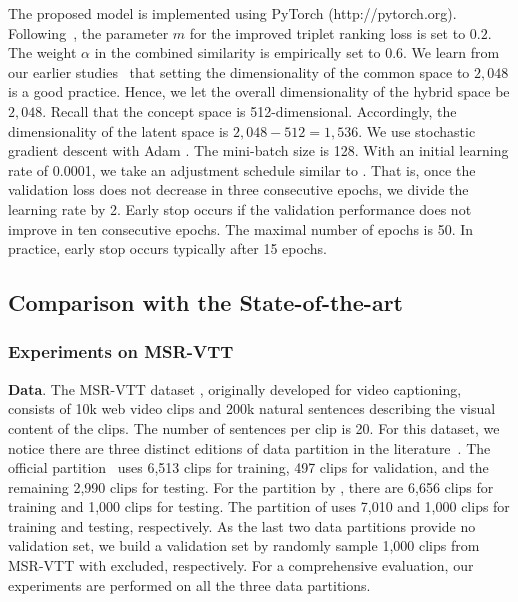 The proposed model is implemented using PyTorch (http://pytorch.org). Following~\cite{faghri2017vse}, the parameter $m$ for the improved triplet ranking loss is set to $0.2$. The weight $\alpha$ in the combined similarity is empirically set to $0.6$. 
We learn from our earlier studies~\cite{li2019w2vv++,cvpr2019-dual-dong} that setting the dimensionality of the common space to $2,048$ is a good practice. Hence, we let the overall dimensionality of the hybrid space be $2,048$. Recall that the concept space is 512-dimensional. Accordingly, the dimensionality of the latent space is $2,048-512=1,536$.
We use stochastic gradient descent with Adam \cite{kingma2014adam}. The mini-batch size is 128. With an initial learning rate of 0.0001, we take an adjustment schedule similar to \cite{dong2018predicting}. That is, once the validation loss does not decrease in three consecutive epochs, we divide the learning rate by 2. Early stop occurs if the validation performance does not improve in ten consecutive epochs. The maximal number of epochs is 50. In practice, early stop occurs typically after 15 epochs. 



\subsection{Comparison with the State-of-the-art} \label{ssec:exp-sota}


\subsubsection{Experiments on MSR-VTT}

\textbf{Data}. 
The MSR-VTT dataset \cite{xu2016msr}, originally developed for video captioning, consists of 10k web video clips and 200k natural sentences describing the visual content of the clips. The number of sentences per clip is 20. 
For this dataset, we notice there are three distinct editions of data partition in the literature~\cite{xu2016msr,miech2018learning,yu2018joint}.
The official partition~\cite{xu2016msr} uses 6,513 clips for training, 497 clips for validation, and the remaining 2,990 clips for testing.
For the partition by \cite{miech2018learning}, there are 6,656 clips for training and 1,000 clips for testing. The partition of \cite{yu2018joint} uses 7,010 and 1,000 clips for training and testing, respectively. 
As the last two data partitions provide no validation set, we build a validation set by randomly sample 1,000 clips from MSR-VTT with \cite{miech2018learning,yu2018joint} excluded, respectively.
For a comprehensive evaluation, our experiments are performed on all the three data partitions.


